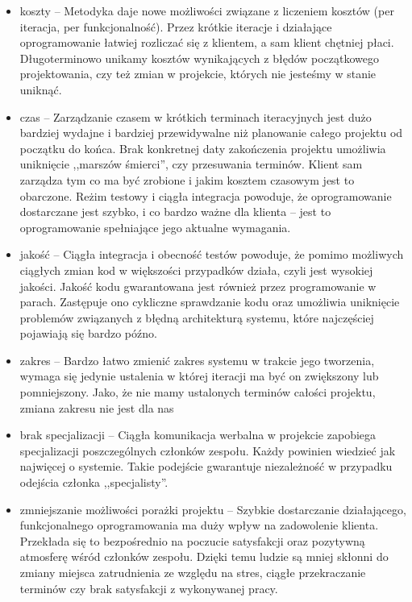 \begin{itemize}
    \item koszty -- Metodyka daje nowe możliwości związane z liczeniem kosztów (per iteracja, per funkcjonalność). Przez krótkie iteracje i działające oprogramowanie łatwiej rozliczać się z klientem, a sam klient chętniej płaci. Długoterminowo unikamy kosztów wynikających z błędów początkowego projektowania, czy też zmian w projekcie, których nie jesteśmy w stanie uniknąć.
    \item czas -- Zarządzanie czasem w krótkich terminach iteracyjnych jest dużo bardziej wydajne i bardziej przewidywalne niż planowanie całego projektu od początku do końca. Brak konkretnej daty zakończenia projektu umożliwia uniknięcie ,,marszów śmierci'', czy przesuwania terminów. Klient sam zarządza tym co ma być zrobione i jakim kosztem czasowym jest to obarczone. Reżim testowy i ciągła integracja powoduje, że oprogramowanie dostarczane jest szybko, i co bardzo ważne dla klienta -- jest to oprogramowanie spełniające jego aktualne wymagania.
    \item jakość -- Ciągła integracja i obecność testów powoduje, że pomimo możliwych ciągłych zmian kod w większości przypadków działa, czyli jest wysokiej jakości. Jakość kodu gwarantowana jest również przez programowanie w parach. Zastępuje ono cykliczne sprawdzanie kodu oraz umożliwia uniknięcie problemów związanych z błędną architekturą systemu, które najczęściej pojawiają się bardzo późno.
    \item zakres -- Bardzo łatwo zmienić zakres systemu w trakcie jego tworzenia, wymaga się jedynie ustalenia w której iteracji ma być on zwiększony lub pomniejszony. Jako, że nie mamy ustalonych terminów całości projektu, zmiana zakresu nie jest dla nas 
    \item brak specjalizacji -- Ciągła komunikacja werbalna w projekcie zapobiega specjalizacji poszczególnych członków zespołu. Każdy powinien wiedzieć jak najwięcej o systemie. Takie podejście gwarantuje niezależność w przypadku odejścia członka ,,specjalisty''.
    \item zmniejszanie możliwości porażki projektu -- Szybkie dostarczanie działającego, funkcjonalnego oprogramowania ma duży wpływ na zadowolenie klienta. Przekłada się to bezpośrednio na poczucie satysfakcji oraz pozytywną atmosferę wśród członków zespołu. Dzięki temu ludzie są mniej skłonni do zmiany miejsca zatrudnienia ze względu na stres, ciągłe przekraczanie terminów czy brak satysfakcji z wykonywanej pracy.
\end{itemize}

